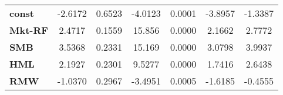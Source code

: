 \begin{center}
\begin{tabular}{lcccccc}
\midrule
\textbf{const}  &      -2.6172       &       0.6523       &     -4.0123     &      0.0001      &      -3.8957      &      -1.3387       \\
\textbf{Mkt-RF} &       2.4717       &       0.1559       &      15.856     &      0.0000      &       2.1662      &       2.7772       \\
\textbf{SMB}    &       3.5368       &       0.2331       &      15.169     &      0.0000      &       3.0798      &       3.9937       \\
\textbf{HML}    &       2.1927       &       0.2301       &      9.5277     &      0.0000      &       1.7416      &       2.6438       \\
\textbf{RMW}    &      -1.0370       &       0.2967       &     -3.4951     &      0.0005      &      -1.6185      &      -0.4555       \\
\bottomrule
\end{tabular}
\end{center}
